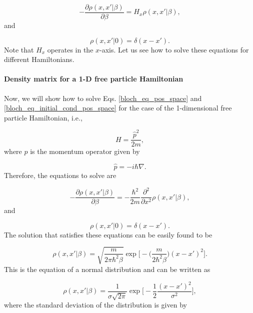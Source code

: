 \documentclass{article}
\begin{document}
\begin{equation}\label{bloch_eq_pos_space}
    - \frac{\partial \rho(x, x' | \beta)}{\partial \beta} = H_{x} \rho(x, x' | \beta),
\end{equation}
%
and

\begin{equation}\label{bloch_eq_initial_cond_pos_space}
    \rho(x, x' | 0) = \delta(x-x').
\end{equation}
%
Note that $H_{x}$ operates in the $x$-axis. Let us see how to solve these equations for different Hamiltonians.

\paragraph{Density matrix for a 1-D free particle Hamiltonian}
Now, we will show how to solve Eqs. \ref{bloch_eq_pos_space} and \ref{bloch_eq_initial_cond_pos_space} for the case of the 1-dimensional free particle Hamiltonian, i.e.,

\begin{equation}
    H = \frac{\hat{p}^{2}}{2m},
\end{equation}
%
where $\hat{p}$ is the momentum operator given by

\begin{equation}
    \hat{p} = -i\hbar \nabla.
\end{equation}
%
Therefore, the equations to solve are

\begin{equation}
    - \frac{\partial \rho(x, x' | \beta)}{\partial \beta} = -\frac{\hbar^{2}}{2m} \frac{\partial^{2}}{\partial x^{2}} \rho(x, x' | \beta),
\end{equation}
%
and

\begin{equation}
    \rho(x, x' | 0) = \delta(x-x').
\end{equation}
%
The solution that satisfies these equations can be easily found to be

\begin{equation}
    \rho(x, x' | \beta) = \sqrt{\frac{m}{2\pi \hbar^{2} \beta}} \exp\bigg[-\bigg(\frac{m}{2 \hbar^{2} \beta}\bigg)(x-x')^{2}\bigg].
\end{equation}
%
This is the equation of a normal distribution and can be written as

\begin{equation}\label{density_matrix_free_particle}
    \rho(x, x' | \beta) = \frac{1}{\sigma \sqrt{2\pi}}\exp\bigg[-\frac{1}{2} \frac{(x-x')^{2}}{\sigma^{2}} \bigg],
\end{equation}
%
where the standard deviation of the distribution is given by
\end{document}

